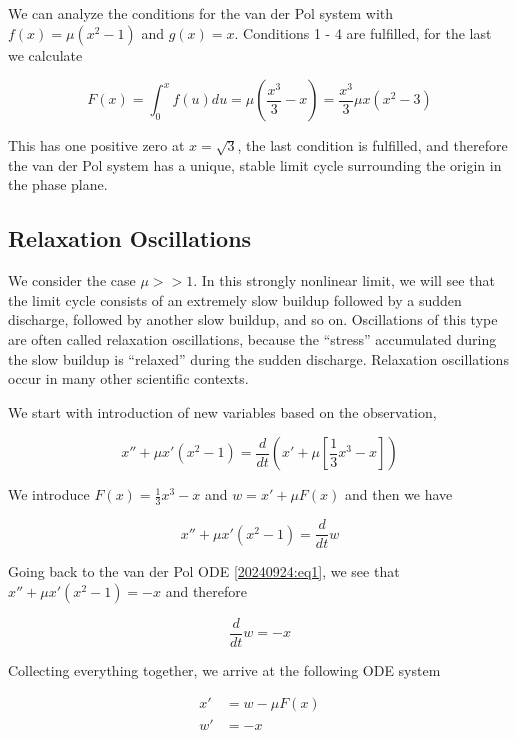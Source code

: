 We can analyze the conditions for the van der Pol system with $f(x) = \mu(x^2 - 1)$ and $g(x) = x$. Conditions 1 - 4 are fulfilled, for the last we calculate

\begin{equation*}
F(x) = \int_0^x f(u) du = \mu \left( \frac{x^3}{3} - x \right) = \frac{x^3}{3} \mu x (x^2 - 3)
\end{equation*}

This has one positive zero at $x = \sqrt{3}$, the last condition is fulfilled, and therefore the van der Pol system has a unique, stable limit cycle surrounding the origin in the phase plane.

\subsection{Relaxation Oscillations}

We consider the case $\mu >> 1$. In this strongly nonlinear limit, we will see that the limit cycle consists of an extremely slow buildup followed by a sudden discharge, followed by another slow buildup, and so on. Oscillations of this type are often called relaxation oscillations, because the “stress” accumulated during the slow buildup is “relaxed” during the sudden discharge. Relaxation oscillations occur in many other scientific contexts.

We start with introduction of new variables based on the observation,

\begin{equation*}
x'' + \mu x' (x^2 - 1) = \frac{d}{dt} \left( x' + \mu \left[ \frac{1}{3} x^3 - x \right] \right)
\end{equation*}

We introduce $F(x) = \frac{1}{3} x^3 - x$ and $w = x' + \mu F(x)$ and then we have

\begin{equation*}
x'' + \mu x' (x^2 - 1) = \frac{d}{dt} w
\end{equation*}

Going back to the van der Pol ODE \eqref{20240924:eq1}, we see that $x'' + \mu x' (x^2 - 1) = - x$ and therefore 

\begin{equation*}
\frac{d}{dt} w = -x
\end{equation*}

Collecting everything together, we arrive at the following ODE system

\begin{align*}
x' &= w - \mu F(x) \\
w' &= -x
\end{align*}

